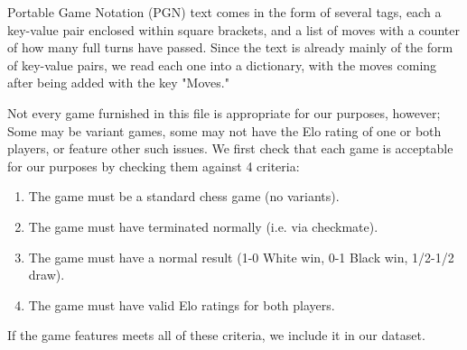 \documentclass[conference]{IEEEtran}
\begin{document}
Portable Game Notation (PGN) text comes in the form of several tags, each a key-value pair enclosed within square brackets, and a list of moves with a counter of how many full turns have passed. Since the text is already mainly of the form of key-value pairs, we read each one into a dictionary, with the moves coming after being added with the key "Moves."

%

Not every game furnished in this file is appropriate for our purposes, however; Some may be variant games, some may not have the Elo rating of one or both players, or feature other such issues. We first check that each game is acceptable for our purposes by checking them against 4 criteria:
\begin{enumerate}
    \item The game must be a standard chess game (no variants).
    \item The game must have terminated normally (i.e. via checkmate).
    \item The game must have a normal result (1-0 White win, 0-1 Black win, 1/2-1/2 draw).
    \item The game must have valid Elo ratings for both players.
\end{enumerate}
If the game features meets all of these criteria, we include it in our dataset.
\end{document}
